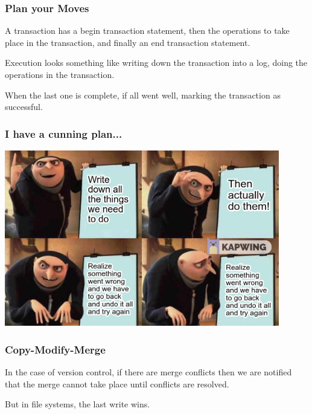 \begin{frame}
\frametitle{Plan your Moves}

A transaction has a begin transaction statement, then the operations to take place in the transaction, and finally an end transaction statement. 

Execution looks something like writing down the transaction into a log, doing the operations in the transaction. 

When the last one is complete, if all went well, marking the transaction as successful.

\end{frame}


\begin{frame}
\frametitle{I have a cunning plan...}

\begin{center}
	\includegraphics[width=0.9\textwidth]{images/gru-plan.jpg}
\end{center}

\end{frame}



\begin{frame}
\frametitle{Copy-Modify-Merge}

In the case of version control, if there are merge conflicts then we are notified that the merge cannot take place until conflicts are resolved. 

But in file systems, the last write wins.

\end{frame}


